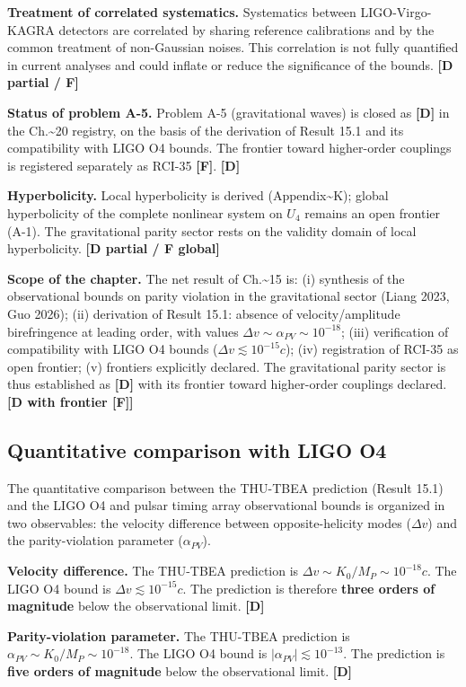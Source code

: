 ﻿\documentclass[11pt,letterpaper]{article}
\begin{document}
\textbf{Treatment of correlated systematics.} Systematics between LIGO-Virgo-KAGRA detectors are correlated by sharing reference calibrations and by the common treatment of non-Gaussian noises. This correlation is not fully quantified in current analyses and could inflate or reduce the significance of the bounds. \textbf{[D partial / F]}

\textbf{Status of problem A-5.} Problem A-5 (gravitational waves) is closed as \textbf{[D]} in the Ch.\textasciitilde{}20 registry, on the basis of the derivation of Result 15.1 and its compatibility with LIGO O4 bounds. The frontier toward higher-order couplings is registered separately as RCI-35 \textbf{[F]}. \textbf{[D]}

\textbf{Hyperbolicity.} Local hyperbolicity is derived (Appendix\textasciitilde{}K); global hyperbolicity of the complete nonlinear system on $U_4$ remains an open frontier (A-1). The gravitational parity sector rests on the validity domain of local hyperbolicity. \textbf{[D partial / F global]}

\textbf{Scope of the chapter.} The net result of Ch.\textasciitilde{}15 is: (i) synthesis of the observational bounds on parity violation in the gravitational sector (Liang 2023, Guo 2026); (ii) derivation of Result 15.1: absence of velocity/amplitude birefringence at leading order, with values $\Delta v \sim \alpha_{PV} \sim 10^{-18}$; (iii) verification of compatibility with LIGO O4 bounds ($\Delta v \lesssim 10^{-15}c$); (iv) registration of RCI-35 as open frontier; (v) frontiers explicitly declared. The gravitational parity sector is thus established as \textbf{[D]} with its frontier toward higher-order couplings declared. \textbf{[D with frontier [F]]}
\subsection{Quantitative comparison with LIGO O4}
The quantitative comparison between the THU-TBEA prediction (Result 15.1) and the LIGO O4 and pulsar timing array observational bounds is organized in two observables: the velocity difference between opposite-helicity modes ($\Delta v$) and the parity-violation parameter ($\alpha_{PV}$).

\textbf{Velocity difference.} The THU-TBEA prediction is $\Delta v \sim K_0/M_P \sim 10^{-18}c$. The LIGO O4 bound is $\Delta v \lesssim 10^{-15}c$. The prediction is therefore \textbf{three orders of magnitude} below the observational limit. \textbf{[D]}

\textbf{Parity-violation parameter.} The THU-TBEA prediction is $\alpha_{PV} \sim K_0/M_P \sim 10^{-18}$. The LIGO O4 bound is $|\alpha_{PV}| \lesssim 10^{-13}$. The prediction is \textbf{five orders of magnitude} below the observational limit. \textbf{[D]}
\end{document}
